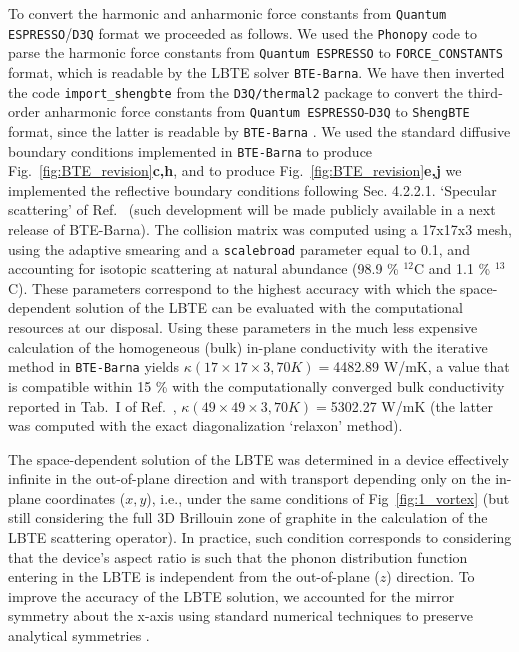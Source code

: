 \documentclass[
prb,
twocolumn,
superscriptaddress,
 amsmath,amssymb,
 aps,
longbibliography,
]{revtex4-2}
\begin{document}
To convert the harmonic and anharmonic force constants from \texttt{Quantum ESPRESSO}/\texttt{D3Q} format \cite{paulatto2013anharmonic,paulatto2015first} we proceeded as follows. We used the \texttt{Phonopy} code \cite{togo_first-principles_2023,Phonopy_parser} to parse the harmonic force constants from \texttt{Quantum ESPRESSO} to \texttt{FORCE\_CONSTANTS} format, which is readable by the LBTE solver \texttt{BTE-Barna}\cite{raya-moreno_bte-barna_2022}. We have then inverted the code \texttt{import\_shengbte} from the \texttt{D3Q/thermal2} package \cite{thermal2module} to convert the third-order anharmonic force constants from \texttt{Quantum ESPRESSO}-\texttt{D3Q} to \texttt{ShengBTE} \cite{li2014shengbte} format, since the latter is readable by \texttt{BTE-Barna} \cite{raya-moreno_bte-barna_2022}.
We used the standard diffusive boundary conditions implemented in \texttt{BTE-Barna} to produce Fig.~\ref{fig:BTE_revision}\textbf{c,h}, and to produce Fig.~\ref{fig:BTE_revision}\textbf{e,j} we implemented
the reflective boundary conditions following Sec. 4.2.2.1. `Specular scattering' of Ref.~\cite{raya-moreno_heat_nodate} (such development will be made publicly available in a next release of BTE-Barna).
The collision matrix was computed using a 17x17x3 mesh, using the adaptive smearing and a \texttt{scalebroad} parameter \cite{li2014shengbte} equal to 0.1, and accounting for isotopic scattering \cite{tamura_isotope_1983} at natural abundance (98.9 \% $^{12}$C and 1.1 \% $^{13}$C). These parameters correspond to the highest accuracy with which the space-dependent solution of the LBTE can be evaluated with the computational resources at our disposal.
Using these parameters in the much less expensive calculation of the homogeneous (bulk) in-plane conductivity with the iterative method in \texttt{BTE-Barna}\cite{raya-moreno_bte-barna_2022} yields $\kappa (17{\times} 17{\times} 3, 70 K){=}$4482.89 W/mK, a value that is compatible within 15 \% with
the computationally converged bulk conductivity reported in Tab.~I of Ref.~\cite{Simoncelli2020}, $\kappa (49{\times} 49{\times} 3, 70 K){=}$5302.27 W/mK (the latter was computed with the exact diagonalization `relaxon' method).

The space-dependent solution of the LBTE was determined in a device effectively infinite in the out-of-plane direction and with transport depending only on the in-plane coordinates ($x,y$), i.e., under the same conditions of Fig~\ref{fig:1_vortex} (but still considering the full 3D Brillouin zone of graphite in the calculation of the LBTE scattering operator). In practice, such condition corresponds to considering that the device's aspect ratio is such that the phonon distribution function entering in the LBTE is independent from the out-of-plane ($z$) direction.
To improve the accuracy of the LBTE solution, we accounted for the mirror symmetry about the x-axis using standard numerical techniques to preserve analytical symmetries \cite{greenshields_openfoam_2024}.
\end{document}

